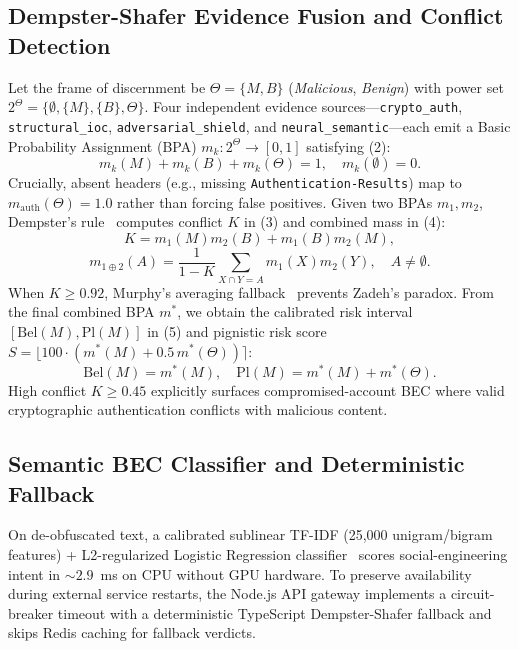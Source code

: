 \documentclass[conference]{IEEEtran}
\begin{document}
\subsection{Dempster-Shafer Evidence Fusion and Conflict Detection}
Let the frame of discernment be $\Theta = \{M, B\}$ (\textit{Malicious}, \textit{Benign}) with power set $2^\Theta = \{\emptyset, \{M\}, \{B\}, \Theta\}$. Four independent evidence sources—\texttt{crypto\_auth}, \texttt{structural\_ioc}, \texttt{adversarial\_shield}, and \texttt{neural\_semantic}—each emit a Basic Probability Assignment (BPA) $m_k : 2^\Theta \to [0,1]$ satisfying (2):
\begin{equation}
    m_k(M) + m_k(B) + m_k(\Theta) = 1, \quad m_k(\emptyset) = 0.
\end{equation}
Crucially, absent headers (e.g., missing \texttt{Authentication-Results}) map to $m_{\text{auth}}(\Theta) = 1.0$ rather than forcing false positives. Given two BPAs $m_1, m_2$, Dempster's rule~\cite{shafer1976mathematical} computes conflict $K$ in (3) and combined mass in (4):
\begin{equation}
    K = m_1(M)m_2(B) + m_1(B)m_2(M),
\end{equation}
\begin{equation}
    m_{1 \oplus 2}(A) = \frac{1}{1 - K} \sum_{X \cap Y = A} m_1(X) m_2(Y), \quad A \neq \emptyset.
\end{equation}
When $K \ge 0.92$, Murphy's averaging fallback~\cite{murphy2000combining} prevents Zadeh's paradox. From the final combined BPA $m^*$, we obtain the calibrated risk interval $[\text{Bel}(M), \text{Pl}(M)]$ in (5) and pignistic risk score $S = \lfloor 100 \cdot (m^*(M) + 0.5\,m^*(\Theta)) \rceil$:
\begin{equation}
    \text{Bel}(M) = m^*(M), \quad \text{Pl}(M) = m^*(M) + m^*(\Theta).
\end{equation}
High conflict $K \ge 0.45$ explicitly surfaces compromised-account BEC where valid cryptographic authentication conflicts with malicious content.

\subsection{Semantic BEC Classifier and Deterministic Fallback}
On de-obfuscated text, a calibrated sublinear TF-IDF (25,000 unigram/bigram features) + L2-regularized Logistic Regression classifier~\cite{pedregosa2011scikit} scores social-engineering intent in $\sim 2.9$~ms on CPU without GPU hardware. To preserve availability during external service restarts, the Node.js API gateway implements a circuit-breaker timeout with a deterministic TypeScript Dempster-Shafer fallback and skips Redis caching for fallback verdicts.
\end{document}
